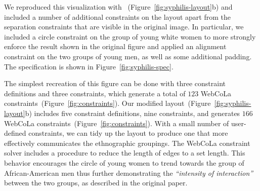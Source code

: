 


We reproduced this visualization with \projectname~(Figure~\ref{fig:syphilis-layout}b) 
and included a number of additional constraints on the layout apart
from the separation constraints that are visible in the original image. In
particular, we included a circle constraint on the group of young white
women to more strongly enforce the result shown in the original figure and
applied an alignment constraint on the two groups of young
men, as well as some additional padding. The \projectname specification
is shown in Figure~\ref{fig:syphilis-spec}.

The simplest recreation of this figure can be done with three constraint
definitions and three \projectname constraints, which generate a total of
$123$ WebCoLa constraints~(Figure~\ref{fig:constraints}).
Our modified layout~(Figure~\ref{fig:syphilis-layout}b) includes 
five constraint definitions, nine \projectname constraints, and generates 
$166$ WebCoLa constraints~(Figure~\ref{fig:constraints}). With a small 
number of user-defined constraints, we can tidy up the layout to produce
one that more effectively communicates the ethnographic groupings. 
 The
WebCoLa constraint solver includes a procedure to reduce the length of
edges to a set length. This behavior encourages the circle of young women
to trend towards the group of African-American men thus further demonstrating
the \emph{``intensity of interaction''} between the two groups, as described in
the original paper.



